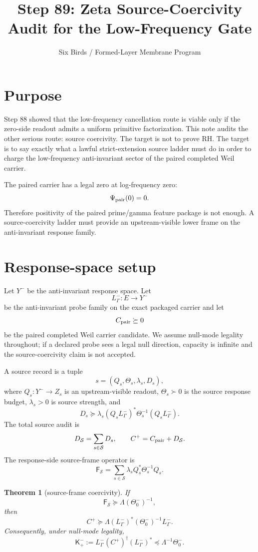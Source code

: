 \documentclass[11pt]{article}
\title{Step 89: Zeta Source-Coercivity Audit for the Low-Frequency Gate}
\author{Six Birds / Formed-Layer Membrane Program}
\date{}
\newtheorem{theorem}{Theorem}
\newcommand{\K}{\mathsf K}
\newcommand{\F}{\mathsf F}
\newcommand{\Thetaop}{\Theta_0^-}
\newcommand{\Y}{Y^-}
\begin{document}
\maketitle

\section{Purpose}

Step 88 showed that the low-frequency cancellation route is viable only if the zero-side readout admits a uniform primitive factorization.  This note audits the other serious route: source coercivity.  The target is not to prove RH.  The target is to say exactly what a lawful strict-extension source ladder must do in order to charge the low-frequency anti-invariant sector of the paired completed Weil carrier.

The paired carrier has a legal zero at log-frequency zero:
\[
  \Psi_{\rm pair}(0)=0.
\]
Therefore positivity of the paired prime/gamma feature package is not enough.  A source-coercivity ladder must provide an upstream-visible lower frame on the anti-invariant response family.

\section{Response-space setup}

Let \(\Y\) be the anti-invariant response space.  Let
\[
  L^-_\Gamma:E\to \Y
\]
be the anti-invariant probe family on the exact packaged carrier and let
\[
  C_{\rm pair}\succeq 0
\]
be the paired completed Weil carrier candidate.  We assume null-mode legality throughout; if a declared probe sees a legal null direction, capacity is infinite and the source-coercivity claim is not accepted.

A source record is a tuple
\[
  s=(Q_s,\Theta_s,\lambda_s,D_s),
\]
where \(Q_s:\Y\to Z_s\) is an upstream-visible readout, \(\Theta_s\succ0\) is the source response budget, \(\lambda_s>0\) is source strength, and
\[
  D_s\succeq \lambda_s (Q_s L^-_\Gamma)^*\Theta_s^{-1}(Q_sL^-_\Gamma).
\]
The total source audit is
\[
  D_{\mathcal S}=\sum_{s\in\mathcal S}D_s,
\qquad
  C^+ = C_{\rm pair}+D_{\mathcal S}.
\]
The response-side source-frame operator is
\[
  \F_{\mathcal S}=\sum_{s\in\mathcal S}\lambda_s Q_s^*\Theta_s^{-1}Q_s.
\]

\begin{theorem}[source-frame coercivity]
If
\[
  \F_{\mathcal S}\succeq \Lambda (\Thetaop)^{-1},
\]
then
\[
  C^+\succeq \Lambda (L^-_\Gamma)^*(\Thetaop)^{-1}L^-_\Gamma.
\]
Consequently, under null-mode legality,
\[
  \K^-_+ := L^-_\Gamma (C^+)^\dagger (L^-_\Gamma)^*\preceq \Lambda^{-1}\Thetaop.
\]
\end{theorem}
\end{document}
